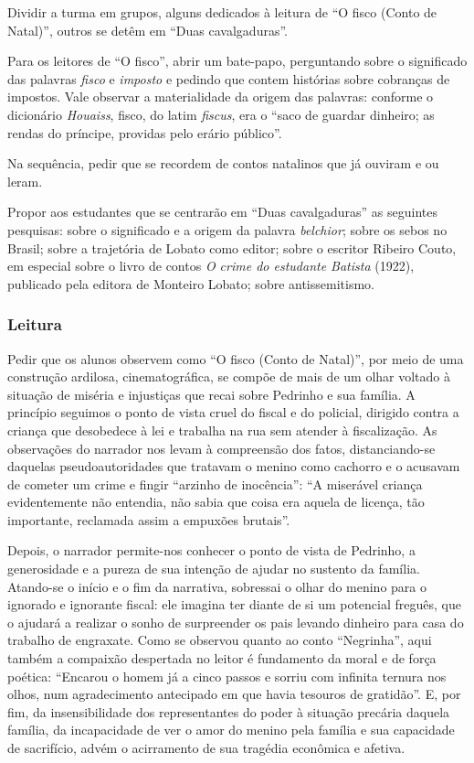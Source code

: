 \documentclass[12pt]{extarticle}
\begin{document}
Dividir a turma em grupos, alguns dedicados à leitura de ``O fisco
(Conto de Natal)'', outros se detêm em ``Duas cavalgaduras''.

Para os leitores de ``O fisco'', abrir um bate-papo, perguntando sobre o
significado das palavras \emph{fisco} e \emph{imposto} e pedindo que
contem histórias sobre cobranças de impostos. Vale observar a
materialidade da origem das palavras: conforme o dicionário
\emph{Houaiss}, fisco, do latim \emph{fiscus}, era o ``saco de guardar
dinheiro; as rendas do príncipe, providas pelo erário público''.

Na sequência, pedir que se recordem de contos natalinos que já ouviram e
ou leram.

Propor aos estudantes que se centrarão em ``Duas cavalgaduras'' as
seguintes pesquisas: sobre o significado e a origem da palavra
\emph{belchior}; sobre os sebos no Brasil; sobre a trajetória de Lobato
como editor; sobre o escritor Ribeiro Couto, em especial sobre o livro
de contos \emph{O crime do estudante Batista} (1922), publicado pela
editora de Monteiro Lobato; sobre antissemitismo.

\subsubsection{Leitura}


Pedir que os alunos observem como ``O fisco (Conto de Natal)'', por meio
de uma construção ardilosa, cinematográfica, se compõe de mais de um
olhar voltado à situação de miséria e injustiças que recai sobre
Pedrinho e sua família. A princípio seguimos o ponto de vista cruel do
fiscal e do policial, dirigido contra a criança que desobedece à lei e
trabalha na rua sem atender à fiscalização. As observações do narrador
nos levam à compreensão dos fatos, distanciando-se daquelas
pseudoautoridades que tratavam o menino como cachorro e o acusavam de
cometer um crime e fingir ``arzinho de inocência'': ``A miserável
criança evidentemente não entendia, não sabia que coisa era aquela de
licença, tão importante, reclamada assim a empuxões brutais''.

Depois, o narrador permite-nos conhecer o ponto de vista de Pedrinho, a
generosidade e a pureza de sua intenção de ajudar no sustento da
família. Atando-se o início e o fim da narrativa, sobressai o olhar do
menino para o ignorado e ignorante fiscal: ele imagina ter diante de si
um potencial freguês, que o ajudará a realizar o sonho de surpreender os
pais levando dinheiro para casa do trabalho de engraxate. Como se
observou quanto ao conto ``Negrinha'', aqui também a compaixão
despertada no leitor é fundamento da moral e de força poética: ``Encarou
o homem já a cinco passos e sorriu com infinita ternura nos olhos, num
agradecimento antecipado em que havia tesouros de gratidão''. E, por
fim, da insensibilidade dos representantes do poder à situação precária
daquela família, da incapacidade de ver o amor do menino pela família e
sua capacidade de sacrifício, advém o acirramento de sua tragédia
econômica e afetiva.
\end{document}
